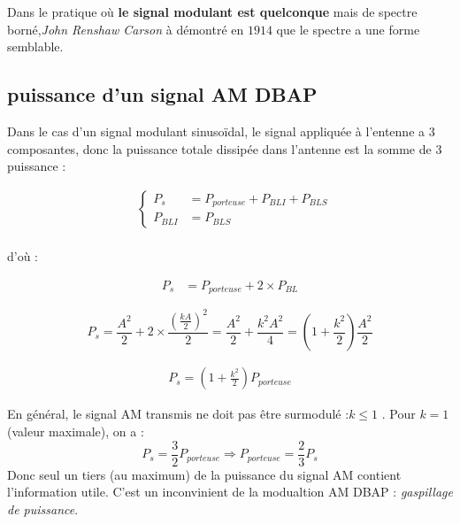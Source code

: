 \documentclass[12pt,a4paper,hidelinks,oneside]{book}
\begin{document}

Dans le pratique où \textbf{le signal modulant est quelconque} mais de spectre borné,\textit{John Renshaw Carson} à démontré en $1914$ que le spectre a une forme semblable.
\subsection{puissance d’un signal AM DBAP}

Dans le cas d’un signal modulant sinusoïdal, le signal appliquée à l'entenne a $3$ composantes, donc la puissance totale dissipée dans l'antenne est la somme de 3 puissance :

\begin{align*}
&
\begin{cases}
P_{s} &=P_{porteuse}+ P_{BLI} + P_{BLS}\\
P_{BLI}  &= P_{BLS}
\end{cases}
\end{align*} \\
d'où :

\begin{equation}
\begin{aligned}
P_{s} &=P_{porteuse} + 2\times P_{BL}
\end{aligned}
\end{equation}


\begin{equation}
P_{s}=\frac{A^{2}}{2}+2 \times \frac{\left(\frac{k A}{2}\right)^{2}}{2}=\frac{A^{2}}{2}+\frac{k^{2} A^{2}}{4}=\left(1+\frac{k^{2}}{2}\right) \frac{A^{2}}{2}
\end{equation}

	\begin{equation}
	\begin{aligned}
	P_{s}=\left(1+\frac{k^{2}}{2}\right) P_{ {porteuse }}
	\end{aligned}
	\end{equation}

En général, le signal AM transmis ne doit pas être surmodulé :$k\leq1$ . Pour $k=1$ (valeur maximale),
on a :
\begin{equation}
P_{s}= \frac{3}{2}P_{porteuse} \Rightarrow P_{porteuse}=\frac{2}{3}P_{s}
\end{equation}
Donc seul un tiers (au maximum) de la puissance du signal AM contient l’information utile. C’est un
inconvinient de la modualtion AM DBAP : \textit{gaspillage de puissance}.
\end{document}
